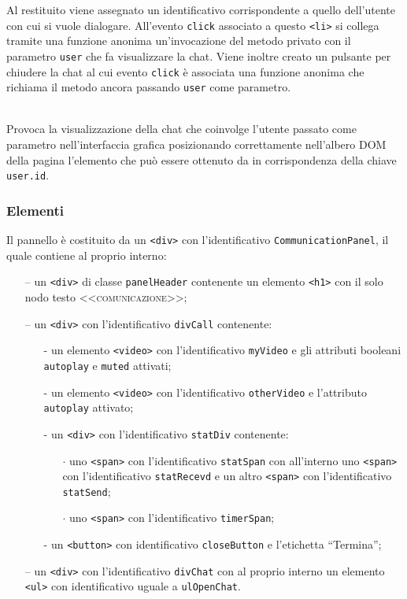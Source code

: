 \begin{description}
   Al  restituito viene assegnato un identificativo corrispondente a quello dell'utente con cui si vuole dialogare. All'evento \verb'click' associato a questo \verb'<li>' si collega tramite una funzione anonima un'invocazione del metodo privato  con il parametro \verb'user' che fa visualizzare la chat. Viene inoltre creato un pulsante per chiudere la chat al cui evento \verb'click' è associata una funzione anonima che richiama il metodo  ancora passando \verb'user' come parametro.

  \item{}\\
  Provoca la visualizzazione della chat che coinvolge l'utente passato come parametro nell'interfaccia grafica posizionando correttamente nell'albero DOM della pagina l'elemento che può essere ottenuto da  in corrispondenza della chiave \verb'user.id'.

\end{description}

\subsubsection*{Elementi}
Il pannello è costituito da un \verb'<div>' con l'identificativo \verb'CommunicationPanel', il quale contiene al proprio interno:
\begin{itemize}
  \item[--] un \verb'<div>' di classe \verb'panelHeader' contenente un elemento \verb'<h1>' con il solo nodo testo \textsc{<<comunicazione>>};
  \item[--] un \verb'<div>' con l'identificativo \verb'divCall' contenente:
  \begin{itemize}
    \item[-] un elemento \verb'<video>' con l'identificativo \verb'myVideo' e gli attributi booleani \verb'autoplay' e \verb'muted' attivati;
    \item[-] un elemento \verb'<video>' con l'identificativo \verb'otherVideo' e l'attributo \verb'autoplay' attivato;
    \item[-] un \verb'<div>' con l'identificativo \verb'statDiv' contenente:
    \begin{itemize}
      \item[$\cdot$] uno \verb'<span>' con l'identificativo \verb'statSpan' con all'interno uno \verb'<span>' con l'identificativo \verb'statRecevd' e un altro \verb'<span>' con l'identificativo \verb'statSend';
      \item[$\cdot$] uno \verb'<span>' con l'identificativo \verb'timerSpan';
    \end{itemize}
    \item[-] un \verb'<button>' con identificativo \verb'closeButton' e l'etichetta ``Termina'';
  \end{itemize}
  \item[--] un \verb'<div>' con l'identificativo \verb'divChat' con al proprio interno un elemento \verb'<ul>' con identificativo uguale a \verb'ulOpenChat'. 
\end{itemize}


